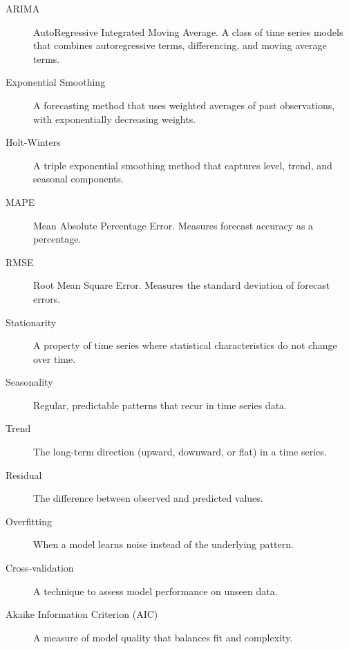 \documentclass[12pt,a4paper]{report}
\begin{document}
\begin{description}
    \item[ARIMA] AutoRegressive Integrated Moving Average. A class of time series models that combines autoregressive terms, differencing, and moving average terms.
    \item[Exponential Smoothing] A forecasting method that uses weighted averages of past observations, with exponentially decreasing weights.
    \item[Holt-Winters] A triple exponential smoothing method that captures level, trend, and seasonal components.
    \item[MAPE] Mean Absolute Percentage Error. Measures forecast accuracy as a percentage.
    \item[RMSE] Root Mean Square Error. Measures the standard deviation of forecast errors.
    \item[Stationarity] A property of time series where statistical characteristics do not change over time.
    \item[Seasonality] Regular, predictable patterns that recur in time series data.
    \item[Trend] The long-term direction (upward, downward, or flat) in a time series.
    \item[Residual] The difference between observed and predicted values.
    \item[Overfitting] When a model learns noise instead of the underlying pattern.
    \item[Cross-validation] A technique to assess model performance on unseen data.
    \item[Akaike Information Criterion (AIC)] A measure of model quality that balances fit and complexity.
\end{description}
\end{document}
